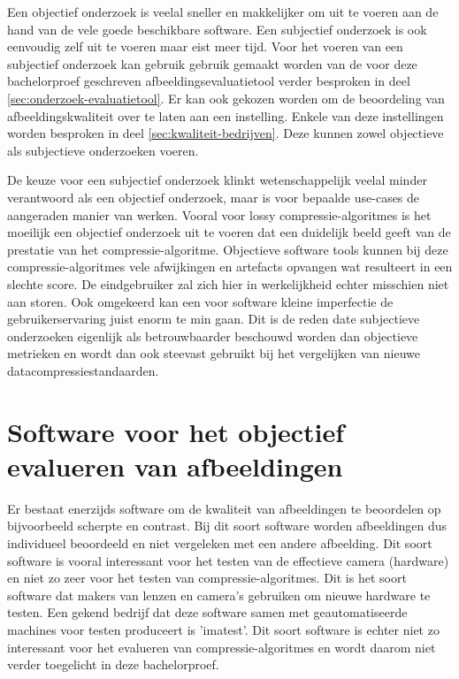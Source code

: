 Een objectief onderzoek is veelal sneller en makkelijker om uit te voeren aan de hand van de vele goede beschikbare software. Een subjectief onderzoek is ook eenvoudig zelf uit te voeren maar eist meer tijd. Voor het voeren van een subjectief onderzoek kan gebruik gebruik gemaakt worden van de voor deze bachelorproef geschreven \gls{afbeeldingsevaluatietool} verder besproken in deel \ref{sec:onderzoek-evaluatietool}. Er kan ook gekozen worden om de beoordeling van afbeeldingskwaliteit over te laten aan een instelling. Enkele van deze instellingen worden besproken in deel \ref{sec:kwaliteit-bedrijven}. Deze kunnen zowel objectieve als subjectieve onderzoeken voeren.

De keuze voor een subjectief onderzoek klinkt wetenschappelijk veelal minder verantwoord als een objectief onderzoek, maar is voor bepaalde \glspl{use-case} de aangeraden manier van werken. Vooral voor \gls{lossy} \glspl{compressie-algoritme} is het moeilijk een objectief onderzoek uit te voeren dat een duidelijk beeld geeft van de prestatie van het \gls{compressie-algoritme}. Objectieve software tools kunnen bij deze \glspl{compressie-algoritme} vele afwijkingen en \glspl{artefact} opvangen wat resulteert in een slechte score. De eindgebruiker zal zich hier in werkelijkheid echter misschien niet aan storen. Ook omgekeerd kan een voor software kleine imperfectie de gebruikerservaring juist enorm te min gaan. Dit is de reden date subjectieve onderzoeken eigenlijk als betrouwbaarder beschouwd worden dan objectieve metrieken en wordt dan ook steevast gebruikt bij het vergelijken van nieuwe datacompressiestandaarden.

\section{Software voor het objectief evalueren van afbeeldingen}
\label{sec:kwaliteit-tools}

Er bestaat enerzijds software om de kwaliteit van afbeeldingen te beoordelen op bijvoorbeeld scherpte en contrast. Bij dit soort software worden afbeeldingen dus individueel beoordeeld en niet vergeleken met een andere afbeelding. Dit soort software is vooral interessant voor het testen van de effectieve camera (hardware) en niet zo zeer voor het testen van \glspl{compressie-algoritme}. Dit is het soort software dat makers van lenzen en camera's gebruiken om nieuwe hardware te testen. Een gekend bedrijf dat deze software samen met geautomatiseerde machines voor testen produceert is 'imatest'. Dit soort software is echter niet zo interessant voor het evalueren van \glspl{compressie-algoritme} en wordt daarom niet verder toegelicht in deze bachelorproef.


